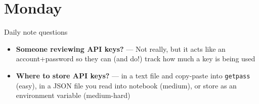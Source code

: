 \documentclass[9pt,aspectratio=169]{beamer}
\begin{document}
\section{Monday}

\begin{frame}{Daily note questions}
    \begin{itemize}
        \item \textbf{Someone reviewing API keys?} --- Not really, but it acts like an account+password so they can (and do!) track how much a key is being used
        \item \textbf{Where to store API keys?} --- in a text file and copy-paste into \texttt{getpass} (easy), in a JSON file you read into notebook (medium), or store as an environment variable (medium-hard)
    \end{itemize}
    
\end{frame}
\end{document}

